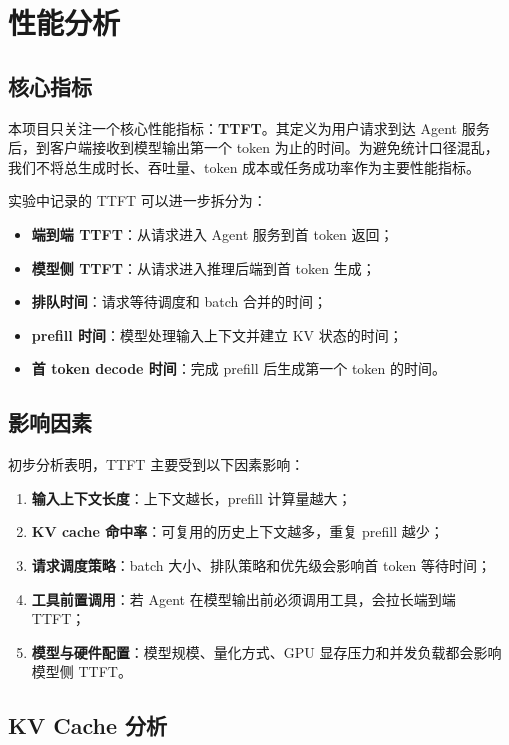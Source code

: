 \section{性能分析}

\subsection{核心指标}

本项目只关注一个核心性能指标：\textbf{TTFT}。其定义为用户请求到达 Agent 服务后，到客户端接收到模型输出第一个 token 为止的时间。为避免统计口径混乱，我们不将总生成时长、吞吐量、token 成本或任务成功率作为主要性能指标。

实验中记录的 TTFT 可以进一步拆分为：

\begin{itemize}
  \item \textbf{端到端 TTFT}：从请求进入 Agent 服务到首 token 返回；
  \item \textbf{模型侧 TTFT}：从请求进入推理后端到首 token 生成；
  \item \textbf{排队时间}：请求等待调度和 batch 合并的时间；
  \item \textbf{prefill 时间}：模型处理输入上下文并建立 KV 状态的时间；
  \item \textbf{首 token decode 时间}：完成 prefill 后生成第一个 token 的时间。
\end{itemize}

\subsection{影响因素}

初步分析表明，TTFT 主要受到以下因素影响：

\begin{enumerate}
  \item \textbf{输入上下文长度}：上下文越长，prefill 计算量越大；
  \item \textbf{KV cache 命中率}：可复用的历史上下文越多，重复 prefill 越少；
  \item \textbf{请求调度策略}：batch 大小、排队策略和优先级会影响首 token 等待时间；
  \item \textbf{工具前置调用}：若 Agent 在模型输出前必须调用工具，会拉长端到端 TTFT；
  \item \textbf{模型与硬件配置}：模型规模、量化方式、GPU 显存压力和并发负载都会影响模型侧 TTFT。
\end{enumerate}

\subsection{KV Cache 分析}

